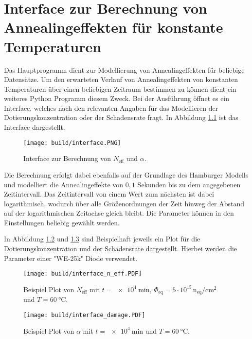 \chapter{Interface zur Berechnung von Annealingeffekten für konstante Temperaturen}
Das Hauptprogramm dient zur Modellierung von Annealingeffekten für beliebige Datensätze.
Um den erwarteten Verlauf von Annealingeffekten von konstanten Temperaturen über einen
beliebigen Zeitraum bestimmen zu können dient ein weiteres Python Programm diesem Zweck.
Bei der Ausführung öffnet es ein Interface, welches nach den relevanten Angaben für
das Modellieren der Dotierungskonzentration oder der Schadensrate fragt. In Abbildung \ref{fig:interface}
ist das Interface dargestellt.

\begin{figure}
    \texttt{[image: build/interface.PNG]}
\caption{Interface zur Berechnung von $N_{\mathrm{eff}}$ und $\alpha$.}
\label{fig:interface}
\end{figure}

Die Berechnung erfolgt dabei ebenfalls auf der Grundlage des Hamburger Modells und modelliert die
Annealingeffekte von
$0,1$ Sekunden bis zu dem angegebenen Zeitintervall.
Das Zeitintervall von einem Wert zum nächsten ist dabei logarithmisch, wodurch über alle
Größenordnungen der Zeit hinweg der Abstand auf der logarithmischen Zeitachse gleich bleibt.
Die Parameter können in den Einstellungen beliebig gewählt werden.

In Abbildung \ref{fig:inter_n} und \ref{fig:inter_damage} sind Beispielhaft jeweils ein Plot für die Dotierungskonzentration und der
Schadensrate dargestellt. Hierbei werden die Parameter einer "WE-25k" Diode verwendet.


\begin{figure}
  \texttt{[image: build/interface\_n\_eff.PDF]}
  \caption{Beispiel Plot von $N_{\mathrm{eff}}$ mit $t = \SI{e4}{\minute}$, $\Phi_{\mathrm{eq}}= 5\cdot 10^{15} \, \mathrm{n_{eq}/cm^2}$ und $T=\SI{60}{\celsius}$.}
  \label{fig:inter_n}
\end{figure}

\begin{figure}
  \texttt{[image: build/interface\_damage.PDF]}
  \caption{Beispiel Plot von $\alpha$ mit $t = \SI{e4}{\minute}$ und $T=\SI{60}{\celsius}$.}
  \label{fig:inter_damage}
\end{figure}
